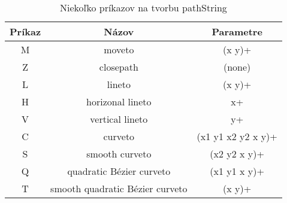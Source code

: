 \begin{center}
\begin{table}
\begin{center}
	\begin{tabular}{|c|c|c|}
	\hline \textbf{Príkaz} & \textbf{Názov} & \textbf{Parametre} \\
	\hline M & moveto & (x y)+ \\ 
	\hline Z & closepath & (none) \\ 
	\hline L & lineto & (x y)+ \\ 
	\hline H & horizonal lineto & x+ \\ 
	\hline V & vertical lineto & y+ \\ 
	\hline C & curveto & (x1 y1 x2 y2 x y)+ \\ 
	\hline S & smooth curveto & (x2 y2 x y)+ \\ 
	\hline Q & quadratic Bézier curveto & (x1 y1 x y)+ \\ 
	\hline T & smooth quadratic Bézier curveto & (x y)+ \\ 
	\hline 
\end{tabular} 
\end{center}
\caption{Niekoľko príkazov na tvorbu pathString}
\label{prikazyPath}
\end{table}
	\end{center}
		
